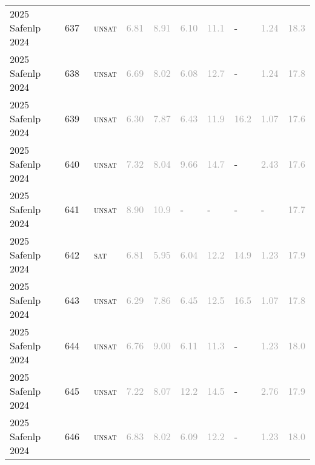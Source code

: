 \begin{center}
{\begin{longtable}{@{}llllllllll@{}}
2025 Safenlp 2024 & 637 & ~\textsc{unsat} & \textcolor{darkgray}{6.81} & \textcolor{darkgray}{8.91} & \textcolor{darkgray}{6.10} & \textcolor{darkgray}{11.1} & - & \textcolor{darkgray}{1.24} & \textcolor{darkgray}{18.3} \\
2025 Safenlp 2024 & 638 & ~\textsc{unsat} & \textcolor{darkgray}{6.69} & \textcolor{darkgray}{8.02} & \textcolor{darkgray}{6.08} & \textcolor{darkgray}{12.7} & - & \textcolor{darkgray}{1.24} & \textcolor{darkgray}{17.8} \\
2025 Safenlp 2024 & 639 & ~\textsc{unsat} & \textcolor{darkgray}{6.30} & \textcolor{darkgray}{7.87} & \textcolor{darkgray}{6.43} & \textcolor{darkgray}{11.9} & \textcolor{darkgray}{16.2} & \textcolor{darkgray}{1.07} & \textcolor{darkgray}{17.6} \\
2025 Safenlp 2024 & 640 & ~\textsc{unsat} & \textcolor{darkgray}{7.32} & \textcolor{darkgray}{8.04} & \textcolor{darkgray}{9.66} & \textcolor{darkgray}{14.7} & - & \textcolor{darkgray}{2.43} & \textcolor{darkgray}{17.6} \\
2025 Safenlp 2024 & 641 & ~\textsc{unsat} & \textcolor{darkgray}{8.90} & \textcolor{darkgray}{10.9} & - & - & - & - & \textcolor{darkgray}{17.7} \\
2025 Safenlp 2024 & 642 & ~\textsc{sat} & \textcolor{darkgray}{6.81} & \textcolor{darkgray}{5.95} & \textcolor{darkgray}{6.04} & \textcolor{darkgray}{12.2} & \textcolor{darkgray}{14.9} & \textcolor{darkgray}{1.23} & \textcolor{darkgray}{17.9} \\
2025 Safenlp 2024 & 643 & ~\textsc{unsat} & \textcolor{darkgray}{6.29} & \textcolor{darkgray}{7.86} & \textcolor{darkgray}{6.45} & \textcolor{darkgray}{12.5} & \textcolor{darkgray}{16.5} & \textcolor{darkgray}{1.07} & \textcolor{darkgray}{17.8} \\
2025 Safenlp 2024 & 644 & ~\textsc{unsat} & \textcolor{darkgray}{6.76} & \textcolor{darkgray}{9.00} & \textcolor{darkgray}{6.11} & \textcolor{darkgray}{11.3} & - & \textcolor{darkgray}{1.23} & \textcolor{darkgray}{18.0} \\
2025 Safenlp 2024 & 645 & ~\textsc{unsat} & \textcolor{darkgray}{7.22} & \textcolor{darkgray}{8.07} & \textcolor{darkgray}{12.2} & \textcolor{darkgray}{14.5} & - & \textcolor{darkgray}{2.76} & \textcolor{darkgray}{17.9} \\
2025 Safenlp 2024 & 646 & ~\textsc{unsat} & \textcolor{darkgray}{6.83} & \textcolor{darkgray}{8.02} & \textcolor{darkgray}{6.09} & \textcolor{darkgray}{12.2} & - & \textcolor{darkgray}{1.23} & \textcolor{darkgray}{18.0} \\

\end{longtable}}
\end{center}
